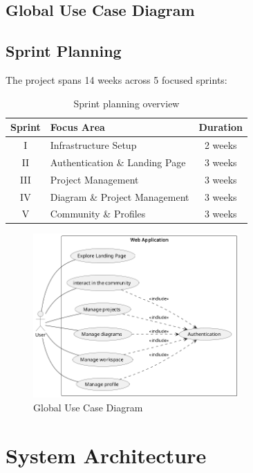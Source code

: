 \subsection{Global Use Case Diagram}
\subsection{Sprint Planning}

The project spans 14 weeks across 5 focused sprints:

\begin{table}[h!]
    \centering
    \begin{tabular}{|c|l|c|}
        \hline
        \textbf{Sprint} & \textbf{Focus Area} & \textbf{Duration} \\ \hline
        I & Infrastructure Setup & 2 weeks \\ \hline
        II & Authentication \& Landing Page & 3 weeks \\ \hline
        III & Project Management & 3 weeks \\ \hline
        IV & Diagram \& Project Management & 3 weeks \\ \hline
        V & Community \& Profiles & 3 weeks \\ \hline
    \end{tabular}
    \caption{Sprint planning overview}
\end{table}

\begin{figure}[H]
    \centering
    \includegraphics[width=0.7\textwidth]{./conception/global_use_case_diagram.png}
    \caption{Global Use Case Diagram}
    \label{fig:global_use_case}
\end{figure}

\section{System Architecture}


